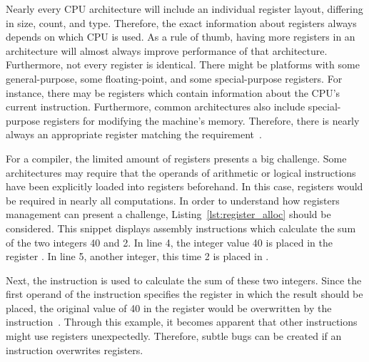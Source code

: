 Nearly every CPU architecture will include an individual register layout, differing in size, count, and type.
Therefore, the exact information about registers always depends on which CPU is used.
As a rule of thumb, having more registers in an architecture will almost always improve performance of that architecture.
Furthermore, not every register is identical.
There might be platforms with some general-purpose, some floating-point, and some special-purpose registers.
For instance, there may be registers which contain information about the CPU's current instruction.
Furthermore, common architectures also include special-purpose registers for modifying the machine's memory.
Therefore, there is nearly always an appropriate register matching the requirement~\cite[Chapter~2]{Dandamudi2005}.


For a compiler, the limited amount of registers presents a big challenge.
Some architectures may require that the operands of arithmetic or logical instructions have been explicitly loaded into registers beforehand.
In this case, registers would be required in nearly all computations.
In order to understand how registers management can present a challenge, Listing~\ref{lst:register_alloc} should be considered.
This snippet displays \riscv{} assembly instructions which calculate the sum of the two integers 40 and 2.
In line 4, the integer value 40 is placed in the register .
In line 5, another integer, this time 2 is placed in .

Next, the  instruction is used to calculate the sum of these two integers.
Since the first operand of the instruction specifies the register in which the result should be placed,
the original value of 40 in the register  would be overwritten by the instruction~\cite[reference]{Patterson2017}.
Through this example, it becomes apparent that other instructions might use registers unexpectedly.
Therefore, subtle bugs can be created if an instruction overwrites registers.

